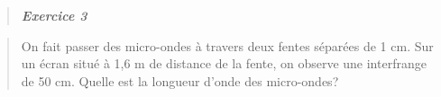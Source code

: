 \begin{quote}
\end{quote}

\begin{quote}
\end{quote}

\begin{quote}
\end{quote}

\begin{quote}
\end{quote}

\begin{quote}
\end{quote}

\begin{quote}
\emph{\textbf{Exercice 3}}
\end{quote}

\begin{quote}
On fait passer des micro-ondes à travers deux fentes séparées de 1 cm.
Sur un écran situé à 1,6 m de distance de la fente, on observe une
interfrange de 50 cm. Quelle est la longueur d'onde des micro-ondes?
\end{quote}

\begin{quote}
\end{quote}

\begin{quote}
\end{quote}

\begin{quote}
\end{quote}

\begin{quote}
\end{quote}

\begin{quote}
\end{quote}

\begin{quote}
\end{quote}

\begin{quote}
\end{quote}

\begin{quote}
\end{quote}

\begin{quote}
\end{quote}

\begin{quote}
\end{quote}

